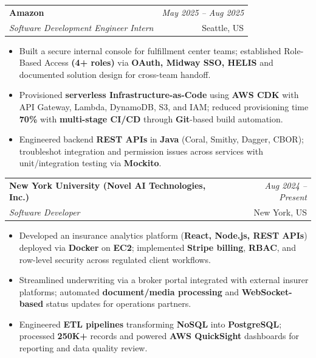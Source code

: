 \documentclass[a4paper,10pt]{article}
\makeatletter
\newcommand{\resumeSubheading}[4]{
\vspace{0.3mm}\item
    \begin{tabular*}{0.98\textwidth}[t]{l@{\extracolsep{\fill}}r}
        \textbf{#1} & \textit{\footnotesize{#4}} \\
        \textit{\footnotesize{#3}} & \footnotesize{#2}\\
    \end{tabular*}\vspace{-2mm}
}
\newcommand{\resumeItemListStart}{\begin{itemize}[leftmargin=*, labelsep=1mm, itemsep=0pt]}
\newcommand{\resumeItemListEnd}{\end{itemize}\vspace{-2mm}}
\makeatother
\begin{document}
\resumeSubheading
{Amazon}{Seattle, US}
{Software Development Engineer Intern}{May 2025 -- Aug 2025}
\resumeItemListStart
\item \footnotesize{Built a secure internal console for fulfillment center teams; established Role-Based Access \textbf{(4+ roles)} via \textbf{OAuth, Midway SSO, HELIS} and documented solution design for cross-team handoff.}
\item \footnotesize{Provisioned \textbf{serverless Infrastructure-as-Code} using \textbf{AWS CDK} with API Gateway, Lambda, DynamoDB, S3, and IAM; reduced provisioning time \textbf{70\%} with \textbf{multi-stage CI/CD} through \textbf{Git}-based build automation.}
\item \footnotesize{Engineered backend \textbf{REST APIs} in \textbf{Java} (Coral, Smithy, Dagger, CBOR); troubleshot integration and permission issues across services with unit/integration testing via \textbf{Mockito}.}
\resumeItemListEnd

\resumeSubheading
{New York University (Novel AI Technologies, Inc.)}{New York, US}
{Software Developer}{Aug 2024 -- Present}
\resumeItemListStart
\item \footnotesize{Developed an insurance analytics platform (\textbf{React, Node.js, REST APIs}) deployed via \textbf{Docker} on \textbf{EC2}; implemented \textbf{Stripe billing}, \textbf{RBAC}, and row-level security across regulated client workflows.}
\item \footnotesize{Streamlined underwriting via a broker portal integrated with external insurer platforms; automated \textbf{document/media processing} and \textbf{WebSocket-based} status updates for operations partners.}
\item \footnotesize{Engineered \textbf{ETL pipelines} transforming \textbf{NoSQL} into \textbf{PostgreSQL}; processed \textbf{250K+} records and powered \textbf{AWS QuickSight} dashboards for reporting and data quality review.}
\resumeItemListEnd
\end{document}
